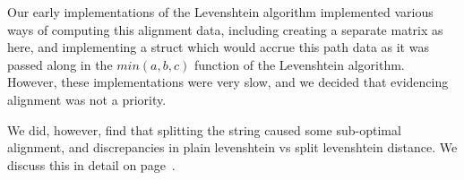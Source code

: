 Our early implementations of the Levenshtein algorithm implemented
various ways of computing this alignment data, including creating a
separate matrix as here, and implementing a struct which would accrue
this path data as it was passed along in the $min(a,b,c)$ function of
the Levenshtein algorithm. However, these implementations were very
slow, and we decided that evidencing alignment was not a priority. 

We did, however, find that splitting the string caused some
sub-optimal alignment, and discrepancies in plain levenshtein vs split
levenshtein distance. We discuss this in detail on
page~\pageref{split-distance-eval}.



